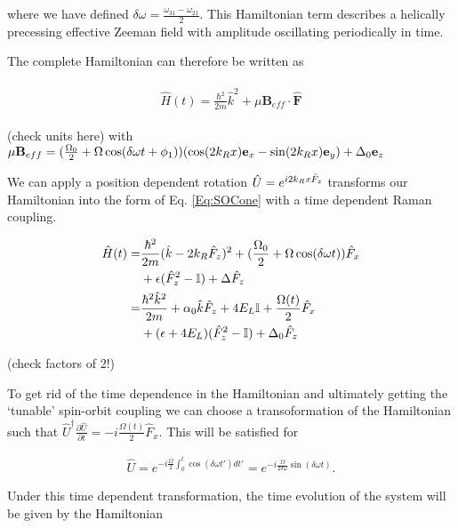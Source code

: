 where we have defined $\delta\omega=\frac{\omega_{31}-\omega_{21}}{2}$. This Hamiltonian term describes a helically precessing effective Zeeman field with amplitude oscillating periodically in time. 

The complete Hamiltonian can therefore be written as

\begin{align}
	\begin{split}
		\hat{H}(t)=\frac{\hbar^2}{2m}\hat{k}^2 + \mu\mathbf{B}_{eff}\cdot\hat{\mathbf{F}}
		\label{Eq:Beff}
	\end{split}
\end{align}

(check units here)
with $\mu\mathbf{B}_{eff}=(\frac{\Omega_0}{2} + \Omega\cos(\delta\omega t+\phi_1))(\cos(2{{k_R}} x)\mathbf{e}_x-\sin(2{{k_R}} x)\mathbf{e}_y)+\Delta_0\mathbf{e}_z$


We can apply a position dependent rotation $\hat{U} = e^{i2{{k_R}} x \hat{F}_z}$ transforms our Hamiltonian into the form of Eq. \ref{Eq:SOCone} with a time dependent Raman coupling.

\begin{align}
	\begin{split}
		\hat{H}(t) = & \frac{\hbar^2}{2m}(\hat{k}-2{{k_R}}\hat{F}_z)^2 + (\frac{\Omega_0}{2} + \Omega\cos(\delta\omega t))\hat{F}_x \\& + \epsilon(\hat{F}_z^2-\mathbb{I})+\Delta\hat{F}_z \\
		=&\frac{\hbar^2\hat{k}^2}{2m} + \alpha_0\hat{k}\hat{F}_z +4E_L\mathbb{I} + \frac{\Omega(t)}{2}\hat{F}_x\\
		& +(\epsilon+4E_L)(\hat{F}_z^2-\mathbb{I}) +\Delta_0\hat{F}_z 
	\end{split}
\end{align}

(check factors of 2!)

To get rid of the time dependence in the Hamiltonian and ultimately getting the `tunable' spin-orbit coupling we can choose a transoformation of the Hamiltonian such that $\hat{U}^{\dagger} \frac{\partial\hat{U}}{\partial t} = -i \frac{\Omega(t)}{2}\hat{F}_x$. This will be satisfied for

\begin{align}
	\hat{U} = e^{-i\frac{\Omega}{2}\int_0^t\cos(\delta\omega t')dt'} = e^{-i\frac{\Omega}{2\delta\omega}\sin(\delta\omega t)}.
\end{align}

Under this time dependent transformation, the time evolution of the system will be given by the Hamiltonian
%

